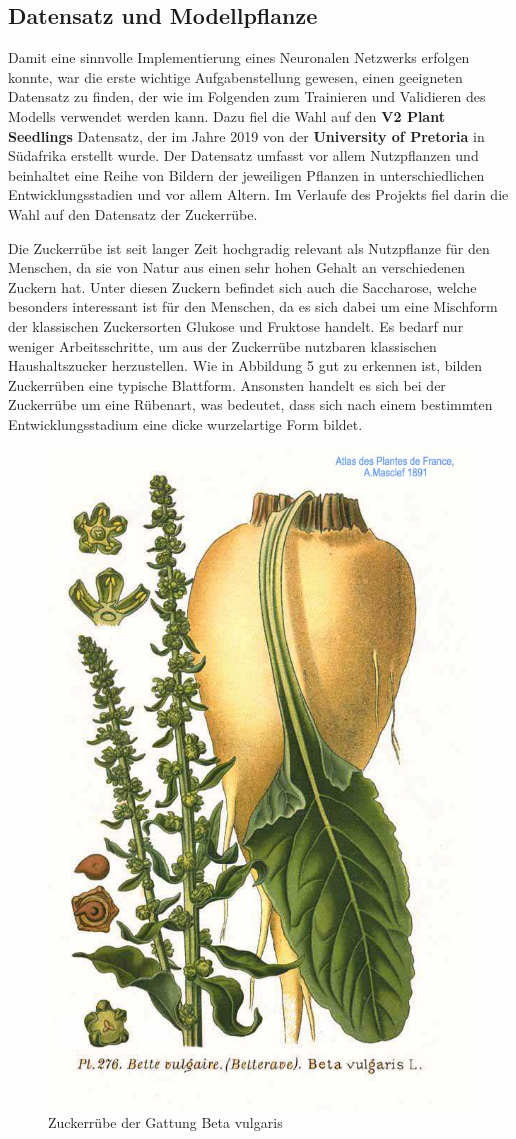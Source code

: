\subsection{Datensatz und Modellpflanze}
Damit eine sinnvolle Implementierung eines Neuronalen Netzwerks erfolgen konnte, war die erste wichtige Aufgabenstellung gewesen, einen geeigneten Datensatz zu finden, der wie im Folgenden zum Trainieren und Validieren des Modells verwendet werden kann. Dazu fiel die Wahl auf den \textbf{V2 Plant Seedlings} Datensatz, der im Jahre 2019 von der \textbf{University of Pretoria} in Südafrika erstellt wurde. Der Datensatz umfasst vor allem Nutzpflanzen und beinhaltet eine Reihe von Bildern der jeweiligen Pflanzen in unterschiedlichen Entwicklungsstadien und vor allem Altern. Im Verlaufe des Projekts fiel darin die Wahl auf den Datensatz der Zuckerrübe. \newline \par
Die Zuckerrübe ist seit langer Zeit hochgradig relevant als Nutzpflanze für den Menschen, da sie von Natur aus einen sehr hohen Gehalt an verschiedenen Zuckern hat. Unter diesen Zuckern befindet sich auch die Saccharose, welche besonders interessant ist für den Menschen, da es sich dabei um eine Mischform der klassischen Zuckersorten Glukose und Fruktose handelt. Es bedarf nur weniger Arbeitsschritte, um aus der Zuckerrübe nutzbaren klassischen Haushaltszucker herzustellen. Wie in Abbildung 5 gut zu erkennen ist, bilden Zuckerrüben eine typische Blattform. Ansonsten handelt es sich bei der Zuckerrübe um eine Rübenart, was bedeutet, dass sich nach einem bestimmten Entwicklungsstadium eine dicke wurzelartige Form bildet.
\begin{figure}
    \centering
    \includegraphics[width=0.5\linewidth]{276_Beta_vulgaris_L.jpg}
    \caption{Zuckerrübe der Gattung Beta vulgaris}
    \label{fig:enter-label}
\end{figure} 
